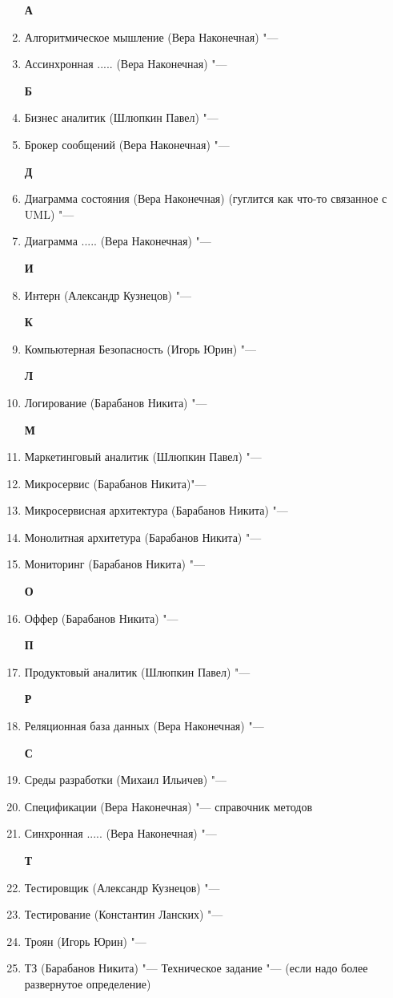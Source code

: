 \documentclass{article}
\begin{document}
\begin{enumerate}
    \textbf{А}
    \item {Алгоритмическое мышление (Вера Наконечная) "---}
    \item {Ассинхронная ..... (Вера Наконечная) "---}

    
    \textbf{Б}
    \item {Бизнес аналитик (Шлюпкин Павел) "---}
    \item {Брокер сообщений (Вера Наконечная) "---}
    

    \textbf{Д}
    \item {Диаграмма состояния (Вера Наконечная) (гуглится как что-то связанное с UML) "--- }
    \item {Диаграмма ..... (Вера Наконечная) "--- }

    \textbf{И}
    \item {Интерн (Александр Кузнецов) "--- }

    \textbf{К}
    \item {Компьютерная Безопасность (Игорь Юрин) "--- }

    \textbf{Л}
    \item {Логирование (Барабанов Никита) "---}

    \textbf{М}
    \item  {Маркетинговый аналитик (Шлюпкин Павел) "--- }
    \item {Микросервис (Барабанов Никита)"---}
    \item {Микросервисная архитектура (Барабанов Никита) "---}
    \item {Монолитная архитетура (Барабанов Никита) "--- }
    \item {Мониторинг (Барабанов Никита) "--- }
    
    \textbf{О}
    \item {Оффер (Барабанов Никита) "---}
    
    \textbf{П}
    \item {Продуктовый аналитик (Шлюпкин Павел) "---}
    
    \textbf{Р}
    \item {Реляционная база данных (Вера Наконечная) "---}

    \textbf{С}
    \item {Среды разработки (Михаил Ильичев) "--- }
    \item {Спецификации (Вера Наконечная) "--- справочник методов}
    \item {Синхронная ..... (Вера Наконечная) "---}
    
    \textbf{Т}
    \item {Тестировщик (Александр Кузнецов) "--- }
    \item {Тестирование (Константин Ланских) "--- }
    \item {Троян (Игорь Юрин) "--- }
    \item {ТЗ (Барабанов Никита) "--- Техническое задание "--- (если надо более развернутое определение)}


\end{enumerate}
\end{document}
